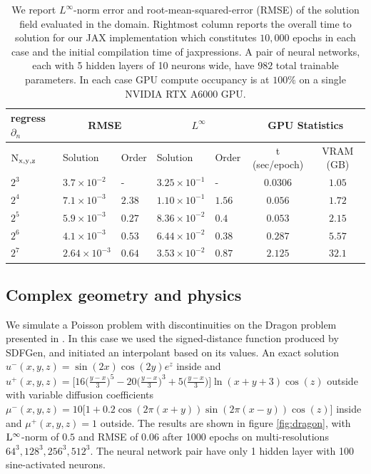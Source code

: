 \documentclass{article}
\begin{document}
\begin{table}[ht]
\begin{center}
\caption{We report $L^\infty$-norm error and root-mean-squared-error (RMSE) of the solution field evaluated in the domain. Rightmost column reports the overall time to solution for our JAX implementation which constitutes $10,000$ epochs in each case and the initial compilation time of jaxpressions. A pair of neural networks, each with 5 hidden layers of 10 neurons wide, have $982$ total trainable parameters. In each case GPU compute occupancy is at $100\%$ on a single NVIDIA RTX A6000 GPU. } \label{tab:convergence}

\begin{tabular}{|l||ll|ll|c|c|}
\hline
regress $\partial_n$ & \multicolumn{2}{c|}{RMSE}& \multicolumn{2}{c|}{$L^\infty$} & \multicolumn{2}{c|}{GPU Statistics} \\
\hline
$\rm N_{x,y,z}$   &   Solution    &   Order   &   Solution   &   Order & t (sec/epoch) & VRAM (GB)\\
\hline 
$2^3$ & $3.7\times 10^{-2}$ &  -        & $3.25\times 10^{-1}$  &   -     & $0.0306$ & $1.05$ \\
$2^4$ & $7.1\times 10^{-3}$ &  $2.38$   & $1.10\times 10^{-1}$   & $1.56$  & $0.056$  & $1.72$ \\ 
$2^5$ & $5.9\times 10^{-3}$ &  $0.27$   & $8.36 \times 10^{-2}$ & $0.4$   & $0.053$  & $2.15$ \\ 
$2^6$ & $4.1\times 10^{-3}$ &  $0.53$   & $6.44\times 10^{-2}$  & $0.38$  & $0.287$  & $5.57$ \\ 
$2^7$ & $2.64\times 10^{-3}$&  $0.64$   & $3.53\times 10^{-2}$  & $0.87$  & $2.125$ & $32.1$ \\ \hline
\end{tabular}
\end{center}
\end{table}

\subsection{Complex geometry and physics}
We simulate a Poisson problem with discontinuities on the Dragon problem presented in \cite{curless1996volumetric}. In this case we used the signed-distance function produced by SDFGen, and initiated an interpolant based on its values. An exact solution $u^-(x,y,z)=\sin(2x)\cos(2y) e^{z}$ inside and
$u^+(x,y,z)=\bigg[ 16\big(\frac{y-x}{3}\big)^5 - 20 \big(\frac{y-x}{3}\big)^3 + 5\big( \frac{y-x}{3}\big) \bigg]\ln(x+y+3)\cos(z)$ outside with variable diffusion coefficients $\mu^-(x,y,z)=10\bigg[ 1+0.2\cos(2\pi(x+y))\sin(2\pi(x-y)) \cos(z) \bigg] $ inside and $\mu^+(x,y,z)=1$ outside. The results are shown in figure \ref{fig:dragon}, with $\rm L^\infty$-norm of $0.5$ and RMSE of $0.06$ after 1000 epochs on multi-resolutions $64^3,128^3,256^3,512^3$. The neural network pair have only 1 hidden layer with 100 sine-activated neurons.
\end{document}
